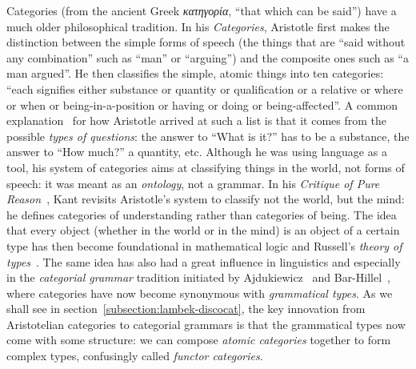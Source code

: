 Categories (from the ancient Greek \emph{\foreignlanguage{greek}{κατηγορία}}, ``that which can be said'') have a much older philosophical tradition.
In his \emph{Categories}, Aristotle first makes the distinction between the simple forms of speech (the things that are ``said without any combination'' such as ``man'' or ``arguing'') and the composite ones such as ``a man argued''.
He then classifies the simple, atomic things into ten categories: ``each signifies either substance or quantity or qualification or a relative or where or when or being-in-a-position or having or doing or being-affected''.
A common explanation~\cite{Ryle37} for how Aristotle arrived at such a list is that it comes from the possible \emph{types of questions}: the answer to ``What is it?'' has to be a substance, the answer to ``How much?'' a quantity, etc.
Although he was using language as a tool, his system of categories aims at classifying things in the world, not forms of speech: it was meant as an \emph{ontology}, not a grammar.
In his \emph{Critique of Pure Reason}~\cite{Kant81}, Kant revisits Aristotle's system to classify not the world, but the mind: he defines categories of understanding rather than categories of being.
The idea that every object (whether in the world or in the mind) is an object of a certain type has then become foundational in mathematical logic and Russell's \emph{theory of types}~\cite{Russell03}.
The same idea has also had a great influence in linguistics and especially in the \emph{categorial grammar} tradition initiated by Ajdukiewicz~\cite{Ajdukiewicz35} and Bar-Hillel~\cite{Bar-Hillel53,Bar-Hillel54}, where categories have now become synonymous with \emph{grammatical types}.
As we shall see in section~\ref{subsection:lambek-discocat}, the key innovation from Aristotelian categories to categorial grammars is that the grammatical types now come with some structure: we can compose \emph{atomic categories} together to form complex types, confusingly called \emph{functor categories}.

